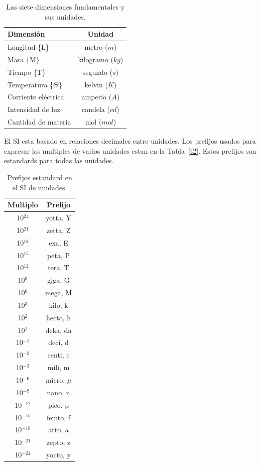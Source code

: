 \documentclass[10pt, oneside]{article}
\begin{document}
\begin{table}[h!]
\centering
\begin{tabular}{l c}
 \hline
 Dimensi\'on & Unidad \\ [0.5ex]
 \hline\hline
 Longitud \{L\} & metro ($m$)  \\
 Masa \{M\} & kilogramo ($kg$)  \\
 Tiempo \{T\} & segundo ($s$)  \\
 Temperatura \{$\Theta$\} & kelvin ($K$)  \\
 Corriente el\'ectrica & amperio ($A$)  \\
 Intensidad de luz &  candela ($cd$) \\ 
 Cantidad de materia & mol ($mol$)  \\ [1ex]
 \hline
\end{tabular}
\caption{Las siete dimensiones fundamentales y sus unidades.}
\label{t1}
\end{table}

El SI esta basado en relaciones decimales entre unidades. Los prefijos usados para expresar los multiples de varios unidades estan en la Tabla~\ref{t2}. Estos prefijos son estandards para todas las unidades.

\begin{table}[h!]
\centering
\begin{tabular}{c c}
 \hline
 Multiplo & Prefijo \\ [0.5ex]
 \hline\hline
 10$^{24}$ & yotta, Y \\
 10$^{21}$ & zetta, Z \\
 10$^{18}$ & exa, E \\
 10$^{15}$ & peta, P \\
 10$^{12}$ & tera, T \\
 10$^{9}$ & giga, G \\
 10$^{6}$ & mega, M \\
 10$^{3}$ & kilo, k \\
 10$^{2}$ & hecto, h \\
 10$^{1}$ & deka, da \\
 10$^{-1}$ & deci, d \\
 10$^{-2}$ & centi, c \\
 10$^{-3}$ & mili, m \\
 10$^{-6}$ & micro, $\mu$ \\
 10$^{-9}$ & nano, n \\
 10$^{-12}$ & pico, p \\
 10$^{-15}$ & femto, f \\
 10$^{-18}$ & atto, a \\
 10$^{-21}$ & zepto, z \\
 10$^{-24}$ & yocto, y \\ [1ex]
  \hline
\end{tabular}
\caption{Prefijos estandard en el SI de unidades.}
\label{t1}
\end{table}
\end{document}

